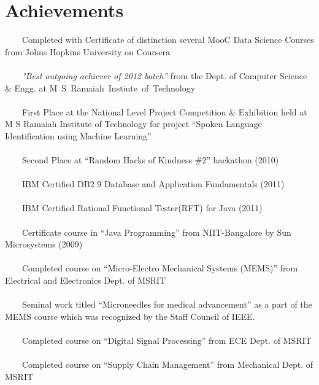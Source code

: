 \documentclass[a4paper,10pt]{article} %
\newcommand{\tabitem}{~~\llap{\textbullet}~~}
\begin{document}
\section{Achievements}
\tabitem Completed with Certificate of distinction several MooC Data Science Courses from Johns Hopkins University on Coursera\\
\\
\tabitem \textit{"Best outgoing achiever of 2012 batch”} from the Dept. of Computer Science \& Engg. at \mbox{M S Ramaiah Instiute of Technology} \\
\\
\tabitem First Place at the National Level Project Competition \& Exhibition held at M S Ramaiah Institute of Technology for project “Spoken Language Identification using Machine Learning”\\
\\
\tabitem Second Place at “Random Hacks of Kindness \#2” hackathon (2010)\\
\\
\tabitem IBM Certified DB2 9 Database and Application Fundamentals (2011)\\
\\
\tabitem IBM Certified Rational Functional Tester(RFT) for Java (2011)\\
\\
\tabitem Certificate course in “Java Programming” from NIIT-Bangalore by Sun Microsystems (2009)\\
\\
\tabitem Completed course on “Micro-Electro Mechanical Systems (MEMS)” from Electrical and Electronics Dept. of MSRIT \\
\\
\tabitem Seminal work titled “Microneedles for medical advancement” as a part of the MEMS course which was recognized by the Staff Council of IEEE.\\
\\
\tabitem Completed course on “Digital Signal Processing” from ECE Dept. of MSRIT \\
\\
\tabitem Completed course on “Supply Chain Management” from Mechanical Dept. of MSRIT
\\

\end{document}
